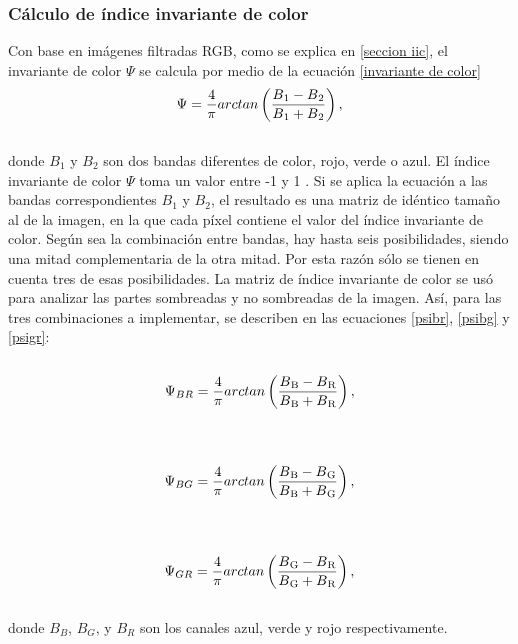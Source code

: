 \subsubsection{Cálculo de índice invariante de color}
Con base en imágenes filtradas RGB, como se explica en \ref{seccion iic}, el invariante de color $\Psi$ se calcula por medio de la ecuación \ref{invariante de color}
\\
\begin{equation}
	\Psi=\frac{4}{\pi} arctan\left(\frac{B\textsubscript{1}-B\textsubscript{2}}{B\textsubscript{1}+B\textsubscript{2}}\right),\label{invariante de color}
\end{equation}
\\
 donde $B_1$ y $B_2$ son dos bandas diferentes de color, rojo, verde o azul. El índice invariante de color $\Psi$ toma un valor entre -1 y 1 \cite{sirmacek_building_2008}. Si se aplica la ecuación a las bandas correspondientes $B_1$ y $B_2$, el resultado es una matriz de idéntico tamaño al de la imagen, en la que cada píxel contiene el valor del índice invariante de color. Según sea la combinación entre bandas, hay hasta seis posibilidades, siendo una mitad complementaria de la otra mitad. Por esta razón sólo se tienen en cuenta tres de esas posibilidades. La matriz de índice invariante de color se usó para analizar las partes sombreadas y no sombreadas de la imagen. Así, para las tres combinaciones a implementar, se describen en las ecuaciones \ref{psibr}, \ref{psibg} y \ref{psigr}:
 \\
 \\
\begin{equation}
	\Psi_{BR}=\frac{4}{\pi} arctan\left(\frac{B\textsubscript{B}-B\textsubscript{R}}{B\textsubscript{B}+B\textsubscript{R}}\right),\label{psibr}
\end{equation}
\\
\\
\begin{equation}
	\Psi_{BG}=\frac{4}{\pi} arctan\left(\frac{B\textsubscript{B}-B\textsubscript{G}}{B\textsubscript{B}+B\textsubscript{G}}\right),\label{psibg}
\end{equation}
\\
\\
\begin{equation}
	\Psi_{GR}=\frac{4}{\pi} arctan\left(\frac{B\textsubscript{G}-B\textsubscript{R}}{B\textsubscript{G}+B\textsubscript{R}}\right),\label{psigr}
\end{equation}
\\
donde $B_{B}$, $B_{G}$, y $B_{R}$ son los canales azul, verde y rojo respectivamente.

